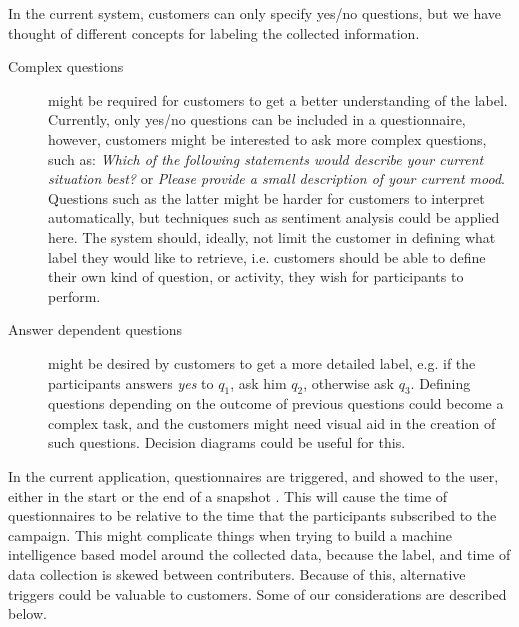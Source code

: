 In the current system, customers can only specify yes/no questions, but we have thought of different concepts for labeling the collected information.

\begin{description}
    \item[Complex questions] might be required for customers to get a better understanding of the label. Currently, only yes/no questions can be included in a questionnaire, however, customers might be interested to ask more complex questions, such as: \emph{Which of the following statements would describe your current situation best?} or \emph{Please provide a small description of your current mood}. Questions such as the latter might be harder for customers to interpret automatically, but techniques such as sentiment analysis \parencite{pang2008opinion} could be applied here. The system should, ideally, not limit the customer in defining what label they would like to retrieve, i.e. customers should be able to define their own kind of question, or activity, they wish for participants to perform.
    \item[Answer dependent questions] might be desired by customers to get a more detailed label, e.g. if the participants answers \emph{yes} to $q_1$, ask him $q_2$, otherwise ask $q_3$. Defining questions depending on the outcome of previous questions could become a complex task, and the customers might need visual aid in the creation of such questions. Decision diagrams could be useful for this.
\end{description}

In the current application, questionnaires are triggered, and showed to the user, either in the start or the end of a snapshot . This will cause the time of questionnaires to be relative to the time that the participants subscribed to the campaign. This might complicate things when trying to build a machine intelligence based model around the collected data, because the label, and time of data collection is skewed between contributers. Because of this, alternative triggers could be valuable to customers. Some of our considerations are described below.

